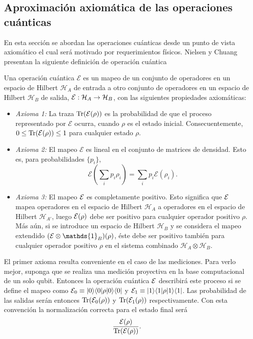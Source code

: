 \subsection{Aproximación axiomática de las operaciones cuánticas} %
En esta sección se abordan las operaciones cuánticas desde un punto de vista
axiomático el cual será motivado por requerimientos físicos. 
Nielsen y
Chuang {\cite{nielsen_chuang_2010}}
presentan la siguiente definición de operación cuántica
\begin{definition}\label{DefE(rho)} Una operación
cuántica $\mathcal{E}$ es un mapeo de un conjunto de operadores en un espacio
de Hilbert $\mathcal{H}_A$ de entrada a otro conjunto de operadores en un
espacio de Hilbert $\mathcal{H}_B$ de salida, $\mathcal{E}: \mathcal{H}_A \rightarrow
\mathcal{H}_B$, con las siguientes propiedades axiomáticas:

    \begin{itemize}
        \item \textit{Axioma 1:} La traza ${\rm Tr} (\mathcal{E}(\rho))$ es la probabilidad de que el proceso representado por $\mathcal{E}$ ocurra, cuando $\rho$ es el estado inicial. Consecuentemente, $0 \le {\rm Tr} (\mathcal{E}(\rho)) \le 1$ para cualquier estado $\rho$.
	\item \textit{Axioma 2:} El mapeo $\mathcal{E}$ es lineal 
en el conjunto de matrices de densidad.
Esto es, para probabilidades
$\{p_i\}$, \[\mathcal{E}\left(\sum _i p_i \rho _i\right)=\sum_i p_i
\mathcal{E}(\rho_i).\]
	\item\textit{Axioma 3:} El mapeo $\mathcal{E}$ es completamente positivo. Esto
significa que $\mathcal{E}$ mapea  operadores en el espacio de Hilbert
$\mathcal{H}_{A}$  a operadores en el espacio de Hilbert $\mathcal{H}_{A'}$, luego $\mathcal{E}(\rho)$ debe ser positivo para cualquier operador positivo $\rho $. Más aún, si se introduce un espacio de Hilbert $ \mathcal{H}_{B}$ y se considera el mapeo extendido $(\E \otimes \mathds{1}_B)(\rho)$, éste debe ser positivo también para cualquier operador positivo $\rho$ en el sistema combinado $\mathcal{H}_A\otimes \mathcal{H}_B$. 
    \end{itemize}
\end{definition}

El primer axioma resulta conveniente en  el caso de las mediciones. Para verlo
mejor, suponga que se realiza una medición
proyectiva en la base computacional de un solo qubit. Entonces la operación
cuántica $\mathcal{E}$ describirá este proceso si se define el mapeo como
$\mathcal{E}_0\equiv|0\rangle \langle0|\rho |0\rangle \langle 0|$ y $\mathcal{E}_1\equiv|1\rangle \langle1|\rho |1\rangle \langle 1|$.
Las probabilidad de las salidas serán entonces ${\rm Tr} (\mathcal{E}_0(\rho))$ y ${\rm Tr}
(\mathcal{E}_1(\rho))$ respectivamente.  Con esta convención la normalización correcta
para el estado final será \[\dfrac{\mathcal{E}(\rho)}{{\rm Tr} (\mathcal{E} (\rho))}.\]

